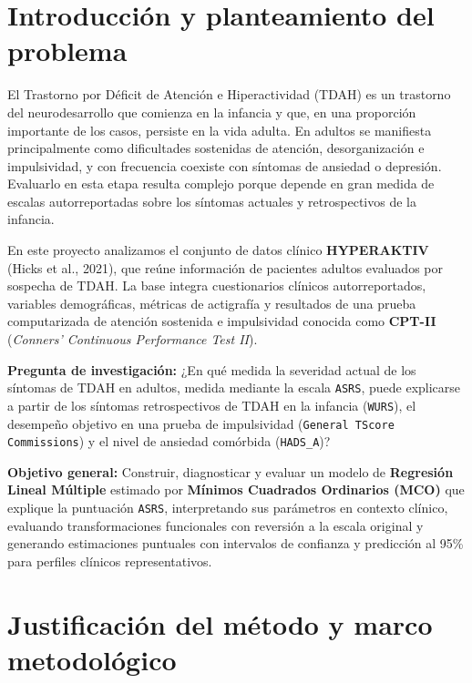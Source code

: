 \documentclass[11pt,letterpaper]{article}
\begin{document}
\tableofcontents
\newpage

\section{Introducción y planteamiento del problema}

El Trastorno por Déficit de Atención e Hiperactividad (TDAH) es un trastorno del neurodesarrollo que comienza en la infancia y que, en una proporción importante de los casos, persiste en la vida adulta. En adultos se manifiesta principalmente como dificultades sostenidas de atención, desorganización e impulsividad, y con frecuencia coexiste con síntomas de ansiedad o depresión. Evaluarlo en esta etapa resulta complejo porque depende en gran medida de escalas autorreportadas sobre los síntomas actuales y retrospectivos de la infancia.

En este proyecto analizamos el conjunto de datos clínico \textbf{HYPERAKTIV} (Hicks et al., 2021), que reúne información de pacientes adultos evaluados por sospecha de TDAH. La base integra cuestionarios clínicos autorreportados, variables demográficas, métricas de actigrafía y resultados de una prueba computarizada de atención sostenida e impulsividad conocida como \textbf{CPT-II} (\textit{Conners' Continuous Performance Test II}).

\textbf{Pregunta de investigación:} ¿En qué medida la severidad actual de los síntomas de TDAH en adultos, medida mediante la escala \texttt{ASRS}, puede explicarse a partir de los síntomas retrospectivos de TDAH en la infancia (\texttt{WURS}), el desempeño objetivo en una prueba de impulsividad (\texttt{General TScore Commissions}) y el nivel de ansiedad comórbida (\texttt{HADS\_A})?

\textbf{Objetivo general:} Construir, diagnosticar y evaluar un modelo de \textbf{Regresión Lineal Múltiple} estimado por \textbf{Mínimos Cuadrados Ordinarios (MCO)} que explique la puntuación \texttt{ASRS}, interpretando sus parámetros en contexto clínico, evaluando transformaciones funcionales con reversión a la escala original y generando estimaciones puntuales con intervalos de confianza y predicción al 95\% para perfiles clínicos representativos.

\section{Justificación del método y marco metodológico}
\end{document}
